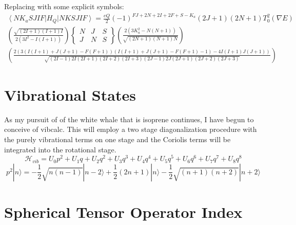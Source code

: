 \documentclass{article}
\begin{document}
Replacing with some explicit symbols:
\begin{multline}
	\left\langle NK_{a}SJIF\right|H_{Q}\left|NKSJIF\right\rangle = \frac{eQ}{2}
	(-1)^{FJ+2N+2I+2F+S-K_{a}}(2J+1)(2N+1)T_{0}^{2}(\nabla E)\\
\left(\frac{\sqrt{(2I+1)(I+1)I}}{2(3I^{2}-I(I+1))}\right)
	\begin{Bmatrix}
	N & J & S \\
	J & N & S
\end{Bmatrix}
\left(\frac{2(3K_{a}^{2}-N(N+1))}{\sqrt{(2N+1)(N+1)N}}\right)\\
\left(\frac{2(3(I(I+1)+J(J+1)-F(F+1))(I(I+1)+J(J+1)-F(F+1)-1)-4I(I+1)J(J+1))}{\sqrt{(2I-1)2I(2I+1)(2I+2)(2I+3)(2J-1)2J(2J+1)(2J+2)(2J+3)}}\right)
\end{multline}

\section{Vibrational States}
As my pursuit of of the white whale that is isoprene continues, I have begun to conceive of vibcalc. This will employ a two stage diagonalization procedure with the purely vibrational terms on one stage and the Coriolis terms will be integrated into the rotational stage.
\begin{equation}
\mathscr{H}_{vib} = U_{0}p^{2} + U_{1}q + U_{2}q^{2} + U_{3}q^{3} + U_{4}q^{4} + U_{5}q^{5} + U_{6}q^{6} + U_{7}q^{7} + U_{8}q^{8}
\end{equation}
\begin{equation}
	p^{2}|n\rangle = -\frac{1}{2}\sqrt{n(n-1)}|n-2\rangle + \frac{1}{2}(2n+1)|n\rangle - \frac{1}{2}\sqrt{(n+1)(n+2)}|n+2\rangle 
\end{equation}

\newpage
\section{Spherical Tensor Operator Index}


\newpage
\end{document}
